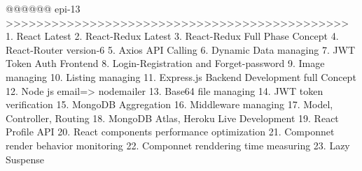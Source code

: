 @@@@@@ epi-13 >>>>>>>>>>>>>>>>>>>>>>>>>>>>>>>>>>>>>>>>>>>>>
1. React Latest
2. React-Redux Latest
3. React-Redux Full Phase Concept 
4. React-Router version-6
5. Axios API Calling
6. Dynamic Data managing
7. JWT Token Auth Frontend
8. Login-Registration and Forget-password
9. Image managing
10. Listing managing 
11. Express.js Backend Development full Concept
12. Node js email=> nodemailer
13. Base64 file managing 
14. JWT token verification
15. MongoDB Aggregation
16. Middleware managing
17. Model, Controller, Routing
18. MongoDB Atlas, Heroku Live Development
19. React Profile API 
20. React components performance optimization
21. Componnet render behavior monitoring
22. Componnet renddering time measuring
23. Lazy Suspense